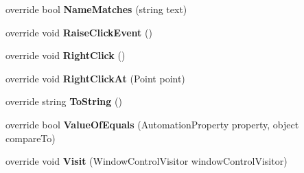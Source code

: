 \begin{DoxyCompactItemize}
\item 
\hypertarget{class_proto_test_1_1_golem_1_1_white_1_1_elements_1_1_white_check_box_a1295be665d78799e42c3c3ceb5863010}{override bool {\bfseries Name\-Matches} (string text)}\label{class_proto_test_1_1_golem_1_1_white_1_1_elements_1_1_white_check_box_a1295be665d78799e42c3c3ceb5863010}

\item 
\hypertarget{class_proto_test_1_1_golem_1_1_white_1_1_elements_1_1_white_check_box_a76abc6745314cd57284a243964bf2096}{override void {\bfseries Raise\-Click\-Event} ()}\label{class_proto_test_1_1_golem_1_1_white_1_1_elements_1_1_white_check_box_a76abc6745314cd57284a243964bf2096}

\item 
\hypertarget{class_proto_test_1_1_golem_1_1_white_1_1_elements_1_1_white_check_box_a6002bf47abc4bb06e129ad6061dd7779}{override void {\bfseries Right\-Click} ()}\label{class_proto_test_1_1_golem_1_1_white_1_1_elements_1_1_white_check_box_a6002bf47abc4bb06e129ad6061dd7779}

\item 
\hypertarget{class_proto_test_1_1_golem_1_1_white_1_1_elements_1_1_white_check_box_a65b6b0ed84d63a33ebe3123fabeb77b5}{override void {\bfseries Right\-Click\-At} (Point point)}\label{class_proto_test_1_1_golem_1_1_white_1_1_elements_1_1_white_check_box_a65b6b0ed84d63a33ebe3123fabeb77b5}

\item 
\hypertarget{class_proto_test_1_1_golem_1_1_white_1_1_elements_1_1_white_check_box_ad575812bb05a42ccf905ce0ec3584477}{override string {\bfseries To\-String} ()}\label{class_proto_test_1_1_golem_1_1_white_1_1_elements_1_1_white_check_box_ad575812bb05a42ccf905ce0ec3584477}

\item 
\hypertarget{class_proto_test_1_1_golem_1_1_white_1_1_elements_1_1_white_check_box_a719c968636dda720f0a74e5da2cb7d32}{override bool {\bfseries Value\-Of\-Equals} (Automation\-Property property, object compare\-To)}\label{class_proto_test_1_1_golem_1_1_white_1_1_elements_1_1_white_check_box_a719c968636dda720f0a74e5da2cb7d32}

\item 
\hypertarget{class_proto_test_1_1_golem_1_1_white_1_1_elements_1_1_white_check_box_a837acde5a5972b702efb6ddc46011273}{override void {\bfseries Visit} (Window\-Control\-Visitor window\-Control\-Visitor)}\label{class_proto_test_1_1_golem_1_1_white_1_1_elements_1_1_white_check_box_a837acde5a5972b702efb6ddc46011273}

\end{DoxyCompactItemize}

